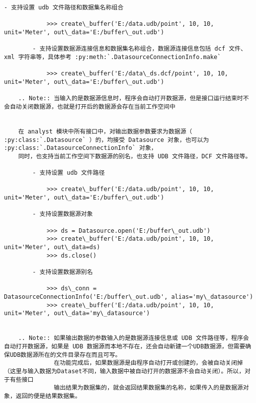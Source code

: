 \documentclass[11pt]{article}
\begin{document}
\begin{Verbatim}[commandchars=\\\{\}]
        - 支持设置 udb 文件路径和数据集名称组合
    
            >>> create\_buffer('E:/data.udb/point', 10, 10, unit='Meter', out\_data='E:/buffer\_out.udb')
    
        - 支持设置数据源连接信息和数据集名称组合，数据源连接信息包括 dcf 文件、xml 字符串等，具体参考 :py:meth:`.DatasourceConnectionInfo.make`
    
            >>> create\_buffer('E:/data\_ds.dcf/point', 10, 10, unit='Meter', out\_data='E:/buffer\_out.udb')
    
    .. Note:: 当输入的是数据源信息时，程序会自动打开数据源，但是接口运行结束时不会自动关闭数据源，也就是打开后的数据源会存在当前工作空间中
    
    
    在 analyst 模块中所有接口中，对输出数据参数要求为数据源（ :py:class:`.Datasource` ）的，均接受 Datasource 对象，也可以为 :py:class:`.DatasourceConnectionInfo` 对象，
    同时，也支持当前工作空间下数据源的别名，也支持 UDB 文件路径，DCF 文件路径等。
    
        - 支持设置 udb 文件路径
    
            >>> create\_buffer('E:/data.udb/point', 10, 10, unit='Meter', out\_data='E:/buffer\_out.udb')
    
        - 支持设置数据源对象
    
            >>> ds = Datasource.open('E:/buffer\_out.udb')
            >>> create\_buffer('E:/data.udb/point', 10, 10, unit='Meter', out\_data=ds)
            >>> ds.close()
    
        - 支持设置数据源别名
    
            >>> ds\_conn = DatasourceConnectionInfo('E:/buffer\_out.udb', alias='my\_datasource')
            >>> create\_buffer('E:/data.udb/point', 10, 10, unit='Meter', out\_data='my\_datasource')
    
    
    .. Note:: 如果输出数据的参数输入的是数据源连接信息或 UDB 文件路径等，程序会自动打开数据源，如果是 UDB 数据源而本地不存在，还会自动新建一个UDB数据源，但需要确保UDB数据源所在的文件目录存在而且可写。
              在功能完成后，如果数据源是由程序自动打开或创建的，会被自动关闭掉（这里与输入数据为Dataset不同，输入数据中被自动打开的数据源不会自动关闭）。所以，对于有些接口
              输出结果为数据集的，就会返回结果数据集的名称，如果传入的是数据源对象，返回的便是结果数据集。


\end{Verbatim}
\end{document}
